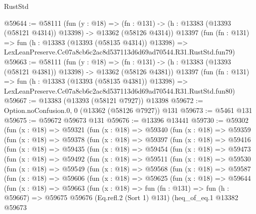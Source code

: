 \begin{lexlean}{RustStd}
\begin{coremodule}
@59644 := @58111
    (fun (y : @18) =>
    (fn : @131) -> (h : @13383 (@13393 (@58121 @4314)) @13398) -> @13362 (@58126 @4314))
    @13397
    (fun (fn : @131) =>
    fun (h : @13383 (@13393 (@58135 @4314)) @13398) =>
    LexLeanPreserve.Cc07a8cb6c2ac8d537113d6d69ad70544.R31.RustStd.fun79)
@59663 := @58111
    (fun (y : @18) =>
    (fn : @131) -> (h : @13383 (@13393 (@58121 @4381)) @13398) -> @13362 (@58126 @4381))
    @13397
    (fun (fn : @131) =>
    fun (h : @13383 (@13393 (@58135 @4381)) @13398) =>
    LexLeanPreserve.Cc07a8cb6c2ac8d537113d6d69ad70544.R31.RustStd.fun80)
@59667 := @13383 (@13393 (@58121 @7927)) @13398
@59672 := Option.noConfusion.{0, 0} (@13362 (@58126 @7927)) @131
@59673 := @5461 @131
@59675 := @59672 @59673 @131
@59676 := @13396 @13441
@59730 := @59302
    (fun (x : @18) =>
    @59321
      (fun (x : @18) =>
      @59340
        (fun (x : @18) =>
        @59359
          (fun (x : @18) =>
          @59378
            (fun (x : @18) =>
            @59397
              (fun (x : @18) =>
              @59416
                (fun (x : @18) =>
                @59435
                  (fun (x : @18) =>
                  @59454
                    (fun (x : @18) =>
                    @59473
                      (fun (x : @18) =>
                      @59492
                        (fun (x : @18) =>
                        @59511
                          (fun (x : @18) =>
                          @59530
                            (fun (x : @18) =>
                            @59549
                              (fun (x : @18) =>
                              @59568
                                (fun (x : @18) =>
                                @59587
                                  (fun (x : @18) =>
                                  @59606
                                    (fun (x : @18) =>
                                    @59625
                                      (fun (x : @18) =>
                                      @59644
                                        (fun (x : @18) =>
                                        @59663
                                          (fun (x : @18) =>
                                          fun (fn : @131) =>
                                          fun (h : @59667) =>
                                          @59675
                                            @59676
                                            (Eq.refl.{2} (Sort 1) @131)
                                            (heq_of_eq.{1}
                                              @13382
                                              @59673

\end{coremodule}
\end{lexlean}
